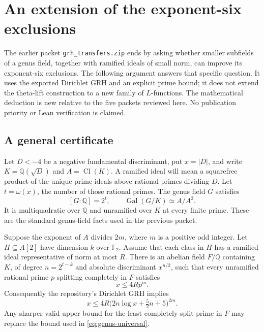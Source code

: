 \section{An extension of the exponent-six exclusions}
\label{sec:genus-extension}

The earlier packet \texttt{grh\_transfers.zip} ends by asking whether
smaller subfields of a genus field, together with ramified ideals of
small norm, can improve its exponent-six exclusions. The following
argument answers that specific question. It uses the exported Dirichlet
GRH and an explicit prime bound; it does not extend the theta-lift
construction to a new family of $L$-functions. The mathematical deduction
is new relative to the five packets reviewed here. No publication
priority or Lean verification is claimed.

\subsection{A general certificate}

Let $D<-4$ be a negative fundamental discriminant, put $x=|D|$, and write
$K=\mathbb Q(\sqrt D)$ and $A=\operatorname{Cl}(K)$. A ramified ideal
will mean a squarefree product of the unique prime ideals above rational
primes dividing $D$. Let $t=\omega(x)$, the number of those rational primes.
The genus field $G$ satisfies
\[
 [G:\mathbb Q]=2^t,\qquad
 \operatorname{Gal}(G/K)\simeq A/A^2.
\]
It is multiquadratic over $\mathbb Q$ and unramified over $K$ at every
finite prime. These are the standard genus-field facts used in the
previous packet.

\begin{theorem}
\label{thm:genus-intermediate}
Suppose the exponent of $A$ divides $2m$, where $m$ is a positive odd
integer. Let $H\subseteq A[2]$ have dimension $k$ over $\mathbb F_2$.
Assume that each class in $H$ has a ramified ideal representative of norm
at most $R$. There is an abelian field $F/\mathbb Q$ containing $K$, of
degree $n=2^{t-k}$ and absolute discriminant $x^{n/2}$, such that every
unramified rational prime $p$ splitting completely in $F$ satisfies
\begin{equation}\label{eq:genus-norm}
                         x\le 4R p^m.
\end{equation}
Consequently the repository's Dirichlet GRH implies
\begin{equation}\label{eq:genus-universal}
 x\le 4R\bigl(2n\log x+\tfrac52n+5\bigr)^{2m}.
\end{equation}
Any sharper valid upper bound for the least completely split prime in
$F$ may replace the bound used in \eqref{eq:genus-universal}.
\end{theorem}

